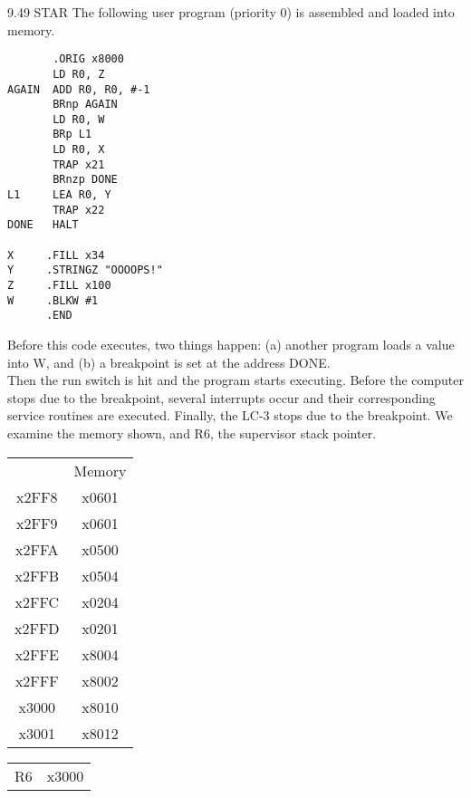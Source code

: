 \documentclass{patt}
\begin{document}
\begin{exercises}
\item[9.49]STAR The following user program (priority 0) is assembled and loaded
into memory.\\

\begin{verbatim}
       .ORIG x8000
       LD R0, Z
AGAIN  ADD R0, R0, #-1
       BRnp AGAIN
       LD R0, W
       BRp L1
       LD R0, X
       TRAP x21
       BRnzp DONE
L1     LEA R0, Y
       TRAP x22
DONE   HALT

X     .FILL x34
Y     .STRINGZ "OOOOPS!"
Z     .FILL x100
W     .BLKW #1
      .END
\end{verbatim}

\noindent
Before this code executes, two things happen: (a) another program loads a
value into W, and (b) a breakpoint is set at the address DONE. \\

\noindent
Then the run switch is hit and the program starts executing. Before the
computer stops due to the breakpoint, several interrupts occur and their
corresponding service routines are executed. Finally, the LC-3 stops due to
the breakpoint. We examine the memory shown, and R6, the supervisor stack
pointer. \\

\begin{center}
\begin{tabular}{c|c|}
\cline{2-2}
& { }{ }{ }{ }{ }Memory{ }{ }{ }{ }{ }   \\
  \cline{2-2}
 x2FF8& x0601 \\ \cline{2-2}
 x2FF9& x0601 \\ \cline{2-2}
 x2FFA& x0500 \\ \cline{2-2}
 x2FFB& x0504 \\ \cline{2-2}
 x2FFC& x0204 \\ \cline{2-2}
 x2FFD& x0201 \\ \cline{2-2}
 x2FFE& x8004 \\ \cline{2-2}
 x2FFF& x8002 \\ \cline{2-2}
 x3000& x8010 \\ \cline{2-2}
 x3001& x8012 \\ \cline{2-2}
 \end{tabular}
\end{center}

\begin{center}
\begin{tabular}{c|c|}
\cline{2-2}
  \cline{2-2}
R6 & x3000 \\ \cline{2-2}
 \end{tabular}
\end{center}


\end{exercises}
\end{document}
